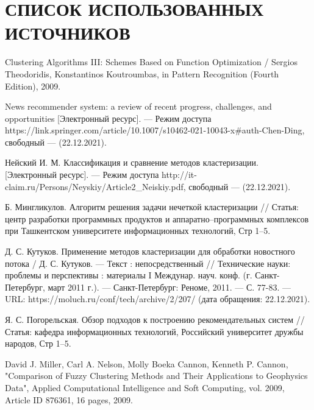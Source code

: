 \section*{СПИСОК ИСПОЛЬЗОВАННЫХ ИСТОЧНИКОВ}

\begingroup
\renewcommand{\section}[2]{}
\begin{thebibliography}{}
	
	Clustering Algorithms III: Schemes Based on Function Optimization  / Sergios Theodoridis, Konstantinos Koutroumbas, in Pattern Recognition (Fourth Edition), 2009.
	
	News recommender system: a review of recent progress, challenges, and opportunities [Электронный ресурс]. — Режим доступа https://link.springer.com/article/10.1007/s10462-021-10043-x\#auth-Chen-Ding, свободный — (22.12.2021).
	
	
	Нейский И. М. Классификация и сравнение методов кластеризации. [Электронный ресурс]. — Режим доступа http://it-claim.ru/Persons/Neyskiy/Article2\_Neiskiy.pdf, свободный — (22.12.2021).
	
	
	Б. Мингликулов. Алгоритм решения задачи нечеткой кластеризации // Статья: центр разработки программных продуктов и аппаратно–программных комплексов при Ташкентском университете информационных технологий, Стр 1–5.
	
	Д. С. Кутуков. Применение методов кластеризации для обработки новостного потока / Д. С. Кутуков. — Текст : непосредственный // Технические науки: проблемы и перспективы : материалы I Междунар. науч. конф. (г. Санкт-Петербург, март 2011 г.). — Санкт-Петербург: Реноме, 2011. — С. 77-83. — URL: https://moluch.ru/conf/tech/archive/2/207/ (дата обращения: 22.12.2021).
	
	Я. С. Погорельская. Обзор подходов к построению рекомендательных систем // Статья: кафедра информационных технологий, Российский университет дружбы народов, Стр 1–5.
	
	
	David J. Miller, Carl A. Nelson, Molly Boeka Cannon, Kenneth P. Cannon, "Comparison of Fuzzy Clustering Methods and Their Applications to Geophysics Data", Applied Computational Intelligence and Soft Computing, vol. 2009, Article ID 876361, 16 pages, 2009.
	

\end{thebibliography}
